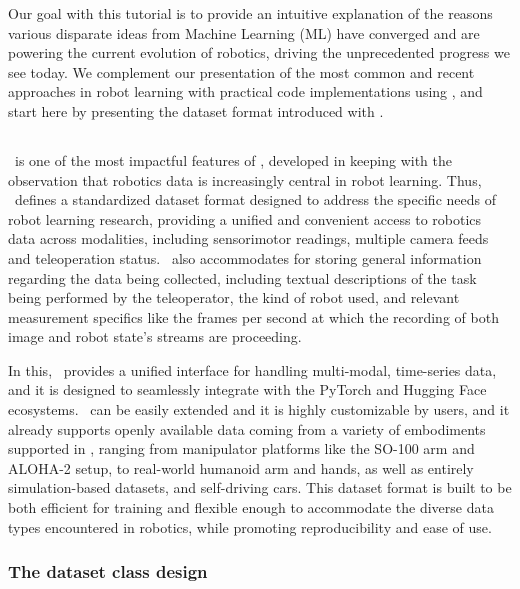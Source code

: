 Our goal with this tutorial is to provide an intuitive explanation of the reasons various disparate ideas from Machine Learning (ML) have converged and are powering the current evolution of robotics, driving the unprecedented progress we see today.
We complement our presentation of the most common and recent approaches in robot learning with practical code implementations using \lerobot, and start here by presenting the dataset format introduced with \lerobot.

\subsection{\lerobotdataset}

\lerobotdataset~is one of the most impactful features of \lerobot, developed in keeping with the observation that robotics data is increasingly central in robot learning. 
Thus, \lerobot~defines a standardized dataset format designed to address the specific needs of robot learning research, providing a unified and convenient access to robotics data across modalities, including sensorimotor readings, multiple camera feeds and teleoperation status.
\lerobotdataset~also accommodates for storing general information regarding the data being collected, including textual descriptions of the task being performed by the teleoperator, the kind of robot used, and relevant measurement specifics like the frames per second at which the recording of both image and robot state's streams are proceeding.

In this, \lerobotdataset~provides a unified interface for handling multi-modal, time-series data, and it is designed to seamlessly integrate with the PyTorch and Hugging Face ecosystems.
\lerobotdataset~can be easily extended and it is highly customizable by users, and it already supports openly available data coming from a variety of embodiments supported in \lerobot, ranging from manipulator platforms like the SO-100 arm and ALOHA-2 setup, to real-world humanoid arm and hands, as well as entirely simulation-based datasets, and self-driving cars.
This dataset format is built to be both efficient for training and flexible enough to accommodate the diverse data types encountered in robotics, while promoting reproducibility and ease of use. 

\subsubsection{The dataset class design}

